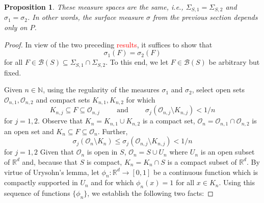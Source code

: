\documentclass[11pt]{article}
\theoremstyle{theorem}
\newtheorem{proposition}[theorem]{Proposition}
\begin{document}
\begin{proposition}\label{prop:Endependence}
These measure spaces are the same, i.e., $\Sigma_{S,1}=\Sigma_{S,2}$ and $\sigma_1=\sigma_2$. In other words, the surface measure $\sigma$ from the previous section depends only on $P$. 
\end{proposition}
\begin{proof}
In view of the two preceding \textcolor{red}{results}, it suffices to show that 
\begin{equation*}
\sigma_1(F)=\sigma_2(F)
\end{equation*}
for all $F\in \mathcal{B}(S)\subseteq \Sigma_{S,1}\cap\Sigma_{S,2}$. To this end, we let $F\in\mathcal{B}(S)$ be arbitrary but fixed. 

Given $n\in\mathbb{N}$, using the regularity of the measures $\sigma_1$ and $\sigma_2$, select open sets $\mathcal{O}_{n,1},\mathcal{O}_{n,2}$ and compact sets $K_{n,1},K_{n,2}$ for which
\begin{equation*}
K_{n,j}\subseteq F\subseteq \mathcal{O}_{n,j}\hspace{1cm}\mbox{and}\hspace{1cm}\sigma_j(\mathcal{O}_{n,j}\setminus K_{n,j})<1/n
\end{equation*}
for $j=1,2$. Observe that $K_n=K_{n,1}\cup K_{n,2}$ is a compact set, $\mathcal{O}_n=\mathcal{O}_{n,1}\cap\mathcal{O}_{n,2}$ is an open set and $K_n\subseteq F\subseteq \mathcal{O}_n$. Further, 
\begin{equation*}
\sigma_j(\mathcal{O}_n\setminus K_n)\leq \sigma_j(\mathcal{O}_{n,j}\setminus K_{n,j})<1/n
\end{equation*}
for $j=1,2$ Given that $\mathcal{O}_n$ is open in $S$, $\mathcal{O}_n=S\cup U_n$ where $U_n$ is an open subset of $\mathbb{R}^d$ and, because that $S$ is compact, $K_n=K_n\cap S$ is a compact subset of $\mathbb{R}^d$. By virtue of Urysohn's lemma, let $\phi_n:\mathbb{R}^d\to [0,1]$ be a continuous function which is compactly supported in $U_n$ and for which $\phi_n(x)=1$ for all $x\in K_n$. Using this sequence of functions $\{\phi_n\}$, we establish the following two facts: 


\end{proof}
\end{document}
